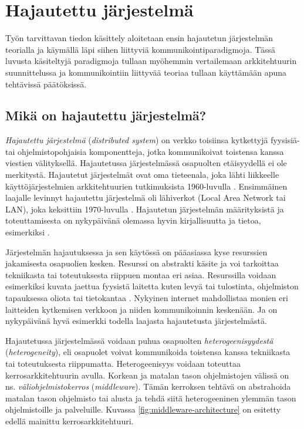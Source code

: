 \chapter{Hajautettu järjestelmä}
\label{ch:distributed-systems}
Työn tarvittavan tiedon käsittely aloitetaan ensin hajautetun järjestelmän teorialla ja käymällä läpi siihen liittyviä kommunikointiparadigmoja. Tässä luvusta käsiteltyjä paradigmoja tullaan myöhemmin vertailemaan arkkitehtuurin suunnittelussa ja kommunikointiin liittyvää teoriaa tullaan käyttämään apuna tehtävissä päätöksissä.


\section{Mikä on hajautettu järjestelmä?}
\emph{Hajautettu järjestelmä} (\emph{distributed system}) on verkko toisiinsa kytkettyjä fyysisiä- tai ohjelmistopohjaisia komponentteja, jotka kommunikoivat toistensa kanssa viestien välityksellä. Hajautetussa järjestelmässä osapuolten etäisyydellä ei ole merkitystä. Hajautetut järjestelmät ovat oma tieteenala, joka lähti liikkeelle käyttöjärjestelmien arkkitehtuurien tutkimuksista 1960-luvulla \cite[s.~384]{andrews2000foundations}. Ensimmäinen laajalle levinnyt hajautettu järjestelmä oli lähiverkot (Local Area Network tai LAN), joka keksittiin 1970-luvulla \cite[s.~32]{andrews2000foundations}. Hajautetun järjestelmän määrityksistä ja toteuttamisesta on nykypäivänä olemassa hyvin kirjallisuutta ja tietoa, esimerkiksi \cite{distributed-systems-concepts-and-design, distributed-event-based-systems, mullender1993distributed, baldoni2005distributed}.

Järjestelmän hajautuksessa ja sen käytössä on pääasiassa kyse resurssien jakamisesta osapuolien kesken. Resurssi on abstrakti käsite ja voi tarkoittaa tekniikasta tai toteutuksesta riippuen montaa eri asiaa. Resurssilla voidaan esimerkiksi kuvata jaettua fyysistä laitetta kuten levyä tai tulostinta, ohjelmiston tapauksessa oliota tai tietokantaa \cite[s.~2--3]{distributed-systems-concepts-and-design}. Nykyinen internet mahdollistaa monien eri laitteiden kytkemisen verkkoon ja niiden kommunikoinnin keskenään. Ja on nykypäivänä hyvä esimerkki todella laajasta hajautetusta järjestelmästä.

Hajautetussa järjestelmässä voidaan puhua osapuolten \emph{heterogeenisyydestä} (\emph{heterogeneity}), eli osapuolet voivat kommunikoida toistensa kanssa tekniikasta tai toteutuksesta riippumatta. Heterogeenisyys voidaan toteuttaa kerrosarkkitehtuurin avulla. Korkean ja matalan tason ohjelmistojen välissä on ns. \emph{väliohjelmistokerros} (\emph{middleware}). Tämän kerroksen tehtävä on abstrahoida matalan tason ohjelmisto tai alusta ja tehdä siitä heterogeeninen ylemmän tason ohjelmistoille ja palveluille. Kuvassa \ref{fig:middleware-architecture} on esitetty edellä mainittu kerrosarkkitehtuuri. \mbox{\cite[s. ~16--17]{distributed-systems-concepts-and-design}} \mbox{\cite[s.~2--3]{distributed-event-based-systems}}

